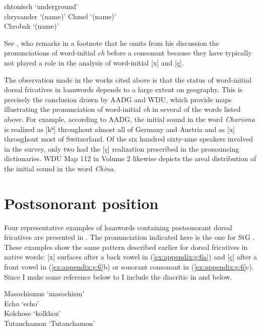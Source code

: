 \ea \label{ex:appendix:g:5}
\ea  chtonisch \tab [çtoːnɪʃ] \tab ‘underground’\\
     chrysander \tab [çʀyzandɐ] \tab ‘(name)’
\ex  Chmel \tab [xmɛl] \tab ‘(name)’\\
     Chrobak \tab [xʀoːbak] \tab ‘(name)’
\z
\z

See \citet[60]{Robinson2001}, who remarks in a footnote that he omits from his discussion the pronunciations of word-initial \textit{ch} before a consonant because they have typically not played a role in the analysis of word-initial [x] and [ç].

The observation made in the works cited above is that the status of word-initial dorsal fricatives in loanwords depends to a large extent on geography. This is precisely the conclusion drawn by AADG and WDU, which provide maps illustrating the pronunciation of word-initial \textit{ch} in several of the words listed above. For example, according to AADG, the initial sound in the word \textit{Charisma} is realized as [kʰ] throughout almost all of Germany and Austria and as [x] throughout most of Switzerland. Of the six hundred sixty-nine  speakers involved in the survey, only two had the [ç] realization prescribed in the pronouncing dictionaries. WDU Map 112 in Volume 2 likewise depicts the areal distribution of the initial sound in the word \textit{China}.

\section{Postsonorant position}
Four representative examples of loanwords containing postsonorant dorsal fricatives are presented in . The pronunciation indicated here is the one for StG \citep{Mangold2005}. These examples show the same pattern described earlier for dorsal fricatives in native words: [x] surfaces after a back vowel in (\ref{ex:appendix:g:6a}) and [ç] after a front vowel in (\ref{ex:appendix:g:6}b) or sonorant consonant in (\ref{ex:appendix:g:6}c). Since I make some reference below to  I include the diacritic in  and below.

\ea%
\label{ex:appendix:g:6}
\ea  \label{ex:appendix:g:6a}
\relax [mɑzoˈxɪsmʊs] \tab   Masochismus \tab ‘masochism’\\
\ex \relax [ˈɛço]  \tab   Echo \tab ‘echo’\\
\ex \relax [kolˈçoːzə] \tab Kolchose \tab ‘kolkhoz’\\
    \relax [tutɑnˈçɑːmon] \tab Tutanchamon \tab ‘Tutanchamon’\\
\z
\z

